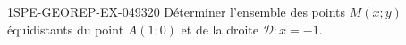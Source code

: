 \begin{exercice}{1SPE-GEOREP-EX-049}{3}{20}
Déterminer l'ensemble des points $M(x ; y)$ équidistants du point $A(1 ; 0)$ et de la droite $\mathcal{D} : x = -1$.
\end{exercice}
